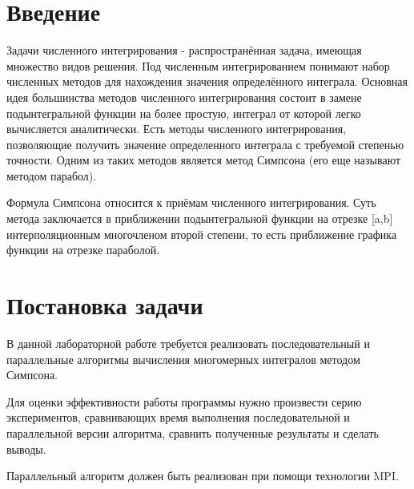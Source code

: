 \documentclass{report}
\begin{document}
\setcounter{page}{2}

\tableofcontents
\newpage

\section*{Введение}
\par Задачи численного интегрирования - распространённая задача, имеющая множество видов решения. Под численным интегрированием понимают набор численных методов для нахождения значения определённого интеграла. Основная идея большинства методов численного интегрирования состоит в замене подынтегральной функции на более простую, интеграл от которой легко вычисляется аналитически. Есть методы численного интегрирования, позволяющие получить значение определенного интеграла с требуемой степенью точности. Одним из таких методов является метод Симпсона (его еще называют методом парабол).
\par Формула Симпсона относится к приёмам численного интегрирования. Суть метода заключается в приближении подынтегральной функции на отрезке [a,b] интерполяционным многочленом второй степени, то есть приближение графика функции на отрезке параболой. 
\newpage

\section*{Постановка задачи}
\par В данной лабораторной работе требуется реализовать последовательный и параллельные алгоритмы вычисления многомерных интегралов методом Симпсона.
\par Для оценки эффективности работы программы нужно произвести серию экспериментов, сравнивающих время выполнения последовательной и параллельной версии алгоритма, сравнить полученные результаты и сделать выводы.
\par Параллельный алгоритм должен быть реализован при помощи технологии MPI.
\newpage

\end{document}

